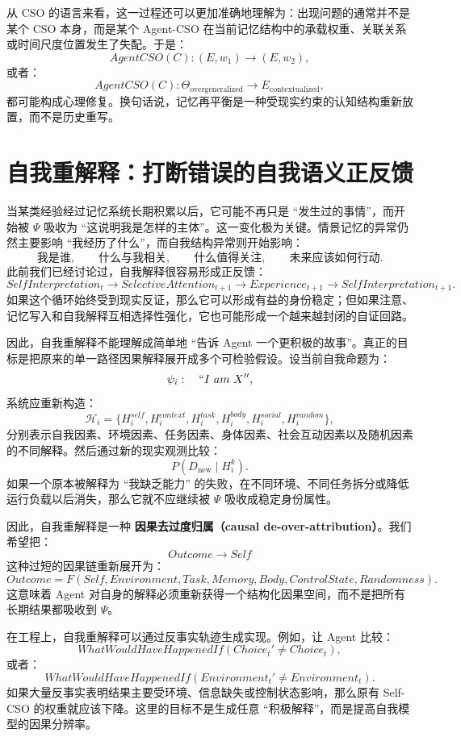 从 CSO 的语言来看，这一过程还可以更加准确地理解为：出现问题的通常并不是某个 CSO 本身，而是某个 Agent-CSO 在当前记忆结构中的承载权重、关联关系或时间尺度位置发生了失配。于是：
\[
AgentCSO(C)
:
(E,w_1)
\rightarrow
(E,w_2),
\]
或者：
\[
AgentCSO(C):
\Theta_{\mathrm{overgeneralized}}
\rightarrow
E_{\mathrm{contextualized}},
\]
都可能构成心理修复。换句话说，记忆再平衡是一种受现实约束的认知结构重新放置，而不是历史重写。

\section{自我重解释：打断错误的自我语义正反馈}

当某类经验经过记忆系统长期积累以后，它可能不再只是 ``发生过的事情''，而开始被 $\Psi$ 吸收为 ``这说明我是怎样的主体''。这一变化极为关键。情景记忆的异常仍然主要影响 ``我经历了什么''，而自我结构异常则开始影响：
\[
\text{我是谁},
\qquad
\text{什么与我相关},
\qquad
\text{什么值得关注},
\qquad
\text{未来应该如何行动}.
\]
此前我们已经讨论过，自我解释很容易形成正反馈：
\[
SelfInterpretation_t
\rightarrow
SelectiveAttention_{t+1}
\rightarrow
Experience_{t+1}
\rightarrow
SelfInterpretation_{t+1}.
\]
如果这个循环始终受到现实反证，那么它可以形成有益的身份稳定；但如果注意、记忆写入和自我解释互相选择性强化，它也可能形成一个越来越封闭的自证回路。

因此，自我重解释不能理解成简单地 ``告诉 Agent 一个更积极的故事''。真正的目标是把原来的单一路径因果解释展开成多个可检验假设。设当前自我命题为：
\[
\psi_i:
\quad
``I\ am\ X'',
\]
系统应重新构造：
\[
\mathcal H_i
=
\{
H_i^{self},
H_i^{context},
H_i^{task},
H_i^{body},
H_i^{social},
H_i^{random}
\},
\]
分别表示自我因素、环境因素、任务因素、身体因素、社会互动因素以及随机因素的不同解释。然后通过新的现实观测比较：
\[
P(
D_{\mathrm{new}}
\mid
H_i^k
).
\]
如果一个原本被解释为 ``我缺乏能力'' 的失败，在不同环境、不同任务拆分或降低运行负载以后消失，那么它就不应继续被 $\Psi$ 吸收成稳定身份属性。

因此，自我重解释是一种 \textbf{因果去过度归属（causal de-over-attribution）}。我们希望把：
\[
Outcome
\rightarrow
Self
\]
这种过短的因果链重新展开为：
\[
Outcome
=
F(
Self,
Environment,
Task,
Memory,
Body,
ControlState,
Randomness
).
\]
这意味着 Agent 对自身的解释必须重新获得一个结构化因果空间，而不是把所有长期结果都吸收到 $\Psi$。

在工程上，自我重解释可以通过反事实轨迹生成实现。例如，让 Agent 比较：
\[
WhatWouldHaveHappenedIf
(
Choice_t'
\neq
Choice_t
),
\]
或者：
\[
WhatWouldHaveHappenedIf
(
Environment_t'
\neq
Environment_t
).
\]
如果大量反事实表明结果主要受环境、信息缺失或控制状态影响，那么原有 Self-CSO 的权重就应该下降。这里的目标不是生成任意 ``积极解释''，而是提高自我模型的因果分辨率。

